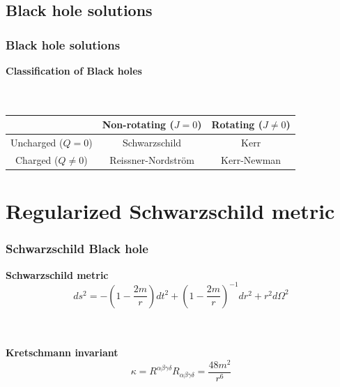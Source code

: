 \documentclass{beamer}
\begin{document}


\subsection{Black hole solutions}

\begin{frame}
\frametitle{Black hole solutions}

\textbf{Classification of Black holes}\\\
\\\


\begin{center}
  \begin{tabular}{| c | c | c |}
    \hline
     & Non-rotating ($J=0$) & Rotating ($J\neq 0$)\\ \hline
    Uncharged ($Q =0 $) & Schwarzschild & Kerr \\ \hline
    Charged ($Q \neq 0$) & Reissner-Nordstr\"om & Kerr-Newman \\
    \hline
  \end{tabular}
\end{center}
\end{frame}


\section{Regularized Schwarzschild metric}
\begin{frame} %
\frametitle{Schwarzschild Black hole}

\textbf{Schwarzschild metric}
\begin{equation}
\label{sch}
ds^2 = -\left(1 - \frac{2m}{r} \right) dt^2 + \left(1 - \frac{2m}{r} \right)^{-1}dr^2 + r^2d\Omega ^2
\end{equation}

\
\\
\
\\

\textbf{Kretschmann invariant}
\begin{equation}
\label{kret}
\kappa = R^{\alpha \beta \gamma \delta} R_{\alpha \beta \gamma \delta} = \frac{48m^2}{r^6}
\end{equation}
\end{frame}
\end{document}
